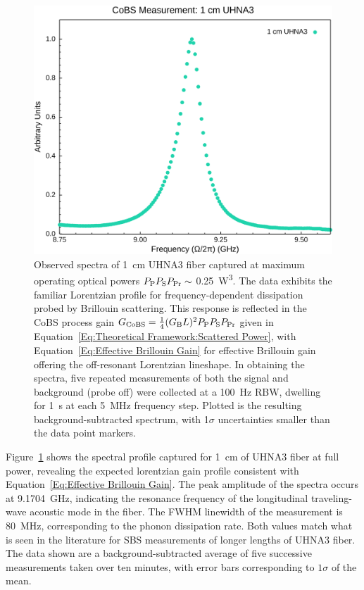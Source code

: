 \begin{figure}[t!]
  \centering
  \hspace{-2em}\includegraphics[width=.85\textwidth]{figs/3-CoBS/CoBS Measurement: 1 cm UHNA3.png}
  \caption[Observed spectra of \SI{1}{\centi\meter} \ac{UHNA3} fiber captured at maximum operating optical powers.]{Observed spectra of \SI{1}{\centi\meter} \ac{UHNA3} fiber captured at maximum operating optical powers \(P_{\rm P}P_{\rm S}P_{\rm Pr} \sim\) \SI{0.25}{\cubic\watt}. The data exhibits the familiar Lorentzian profile for frequency-dependent dissipation probed by Brillouin scattering. This response is reflected in the \ac{CoBS} process gain \(G_{\rm CoBS}=\frac{1}{4}(G_{\rm B}L)^{2}P_{\rm P}P_{\rm S}P_{\rm Pr}\) given in Equation~\ref{Eq:Theoretical Framework:Scattered Power}, with Equation~\ref{Eq:Effective Brillouin Gain} for effective Brillouin gain offering the off-resonant Lorentzian lineshape. In obtaining the spectra, five repeated measurements of both the signal and background (probe off) were collected at a \SI{100}{\hertz} \ac{RBW}, dwelling for \SI{1}{\second} at each \SI{5}{\mega\hertz} frequency step. Plotted is the resulting background-subtracted spectrum, with 1\(\sigma\) uncertainties smaller than the data point markers.}
  \label{fig:1cmUHNA3}
\end{figure}

Figure~\ref{fig:1cmUHNA3} shows the spectral profile captured for \SI{1}{\centi\meter} of \ac{UHNA3} fiber at full power, revealing the expected lorentzian gain profile consistent with Equation~\ref{Eq:Effective Brillouin Gain}. The peak amplitude of the spectra occurs at \SI{9.1704}{\giga\hertz}, indicating the resonance frequency of the longitudinal traveling-wave acoustic mode in the fiber. The \ac{FWHM} linewidth of the measurement is \SI{80}{\mega\hertz}, corresponding to the phonon dissipation rate. Both values match what is seen in the literature for \ac{SBS} measurements of longer lengths of \ac{UHNA3} fiber. \cite{behunin2015long} The data shown are a background-subtracted average of five successive measurements taken over ten minutes, with error bars corresponding to \(1\sigma\) of the mean.

